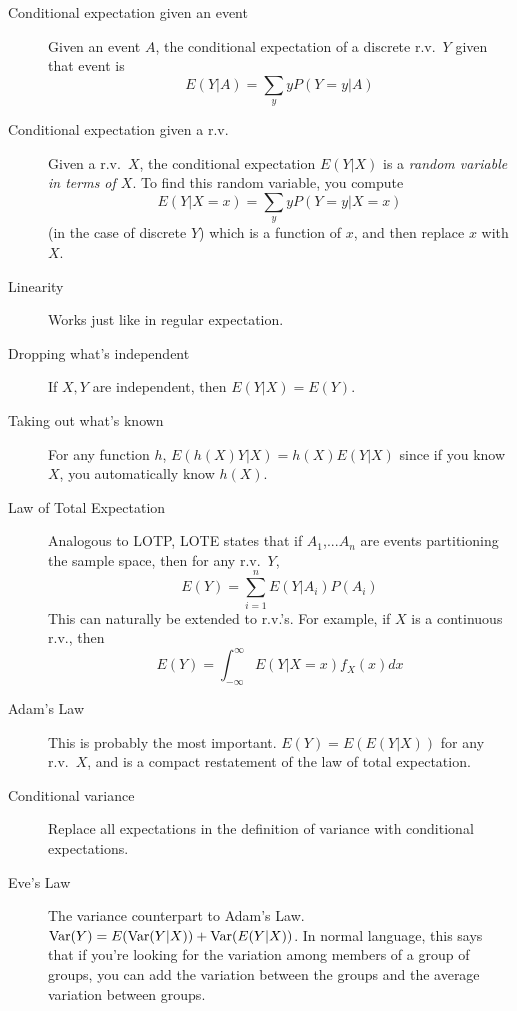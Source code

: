 \documentclass{article}
\begin{document}
 

\header

\begin{description}

\item[Conditional expectation given an event] Given an event $A$, the conditional expectation of a discrete r.v.~$Y$ given that event is $$E(Y|A) = \sum_y yP(Y=y|A)$$

\item[Conditional expectation given a r.v.] Given a r.v.~$X$, the conditional expectation $E(Y|X)$ is a \textit{random variable in terms of $X$}. To find this random variable, you compute $$E(Y|X = x) = \sum_y yP(Y=y|X=x)$$ (in the case of discrete $Y$) which is a function of $x$, and then replace $x$ with $X$.

\item[Linearity] Works just like in regular expectation.

\item[Dropping what's independent] If $X, Y$ are independent, then $E(Y|X) = E(Y)$.

\item[Taking out what's known] For any function $h$, $E(h(X)Y|X) = h(X)E(Y|X)$ since if you know $X$, you automatically know $h(X)$.

\item[Law of Total Expectation] Analogous to LOTP, LOTE states that if $A_1$,...$A_n$ are events partitioning the sample space, then for any r.v.~$Y$,
\[
E(Y) = \sum_{i=1}^n E(Y|A_i)P(A_i)
\]
This can naturally be extended to r.v.'s. For example, if $X$ is a continuous r.v., then 
\[
E(Y) = \int_{-\infty}^{\infty} E(Y|X=x)f_X(x) dx
\]

\item[Adam's Law] This is probably the most important. $E(Y) = E(E(Y|X))$ for any r.v.~$X$, and is a compact restatement of the law of total expectation.

\item[Conditional variance] Replace all expectations in the definition of variance with conditional expectations.

\item[Eve's Law] The variance counterpart to Adam's Law. $\textrm{Var}(Y) = E(\textrm{Var}(Y|X)) + \textrm{Var}(E(Y|X))$. In normal language, this says that if you're looking for the variation among members of a group of groups, you can add the variation between the groups and the average variation between groups.


\end{description}
\end{document}

